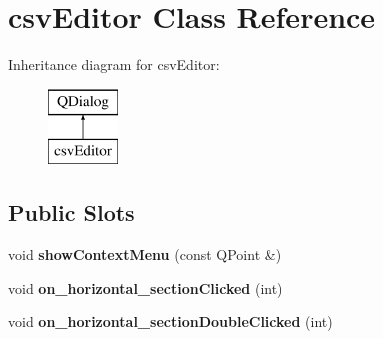 \hypertarget{classcsv_editor}{}\section{csv\+Editor Class Reference}
\label{classcsv_editor}
Inheritance diagram for csv\+Editor\+:\begin{figure}[H]
\begin{center}
\leavevmode
\includegraphics[height=2.000000cm]{classcsv_editor}
\end{center}
\end{figure}
\subsection*{Public Slots}
\begin{DoxyCompactItemize}
\item 
\mbox{\label{classcsv_editor_add820070225afa37652bab69c770adca}} 
void {\bfseries show\+Context\+Menu} (const Q\+Point \&)
\item 
\mbox{\label{classcsv_editor_a82aa5573c2f3f8b654460681287f7a7e}} 
void {\bfseries on\+\_\+horizontal\+\_\+section\+Clicked} (int)
\item 
\mbox{\label{classcsv_editor_a44ceacc90b21d1de3a3c922b94416ac0}} 
void {\bfseries on\+\_\+horizontal\+\_\+section\+Double\+Clicked} (int)
\end{DoxyCompactItemize}
